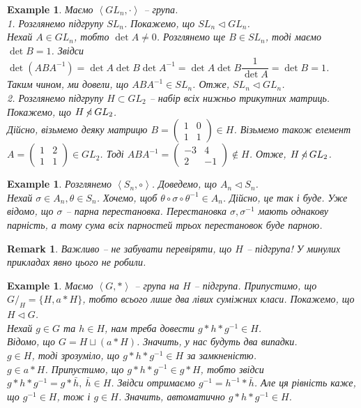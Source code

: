 \documentclass[a4paper, 10pt]{article}
\theoremstyle{theoremdd}
\theoremstyle{theoremdd}
\theoremstyle{theoremdd}
\theoremstyle{theoremdd}
\theoremstyle{theoremdd}
\newtheorem{example}[theorem]{Example}
\theoremstyle{theoremdd}
\theoremstyle{theoremdd}
\theoremstyle{theoremdd}
\theoremstyle{theoremdd}
\theoremstyle{theoremdd}
\theoremstyle{theoremdd}
\newtheorem{remark}[theorem]{Remark}
\theoremstyle{theoremdd}
\theoremstyle{theoremdd}
\theoremstyle{theoremdd}
\theoremstyle{theoremdd}
\begin{document}
\begin{example}
Маємо $\left<GL_n, \cdot \right>$ -- група.\\
1. Розглянемо підгрупу $SL_n$. Покажемо, що $SL_n \triangleleft GL_n$.\\
Нехай $A \in GL_n$, тобто $\det A \neq 0$. Розглянемо ще $B \in SL_n$, тоді маємо $\det B = 1$. Звідси\\
$\det (ABA^{-1}) = \det A \det B \det A^{-1} = \det A \det B \dfrac{1}{\det A} = \det B = 1$.\\
Таким чином, ми довели, що $ABA^{-1} \in SL_n$. Отже, $SL_n \triangleleft GL_n$.
\bigskip \\
2. Розглянемо підгрупу $H \subset GL_2$ -- набір всіх нижньо трикутних матриць. Покажемо, що $H \centernot\triangleleft GL_2$.\\
Дійсно, візьмемо деяку матрицю $B = \begin{pmatrix}
1 & 0 \\
1 & 1
\end{pmatrix} \in H$. Візьмемо також елемент $A = \begin{pmatrix}
1 & 2\\
1 & 1
\end{pmatrix} \in GL_2$. Тоді $ABA^{-1} = \begin{pmatrix}
-3 & 4 \\
2 & -1
\end{pmatrix} \not \in H$. Отже, $H \centernot\triangleleft GL_2$.
\end{example}

\begin{example}
Розглянемо $\left<S_n, \circ\right>$. Доведемо, що $A_n \triangleleft S_n$.\\
Нехай $\sigma \in A_n, \theta \in S_n$. Хочемо, щоб $\theta \circ \sigma \circ \theta^{-1} \in A_n$. Дійсно, це так і буде. Уже відомо, що $\sigma$ -- парна перестановка. Перестановка $\sigma, \sigma^{-1}$ мають однакову парність, а тому сума всіх парностей трьох перестановок буде парною.
\end{example}

\begin{remark}
Важливо -- не забувати перевіряти, що $H$ -- підгрупа! У минулих прикладах явно цього не робили.
\end{remark}

\begin{example}
Маємо $\left< G, * \right>$ -- група на $H$ -- підгрупа. Припустимо, що $G/_H = \{H, a*H\}$, тобто всього лише два лівих суміжних класи. Покажемо, що $H \triangleleft G$.
\bigskip \\
Нехай $g \in G$ та $h \in H$, нам треба довести $g*h*g^{-1} \in H$.\\
Відомо, що $G = H \sqcup (a*H)$. Значить, у нас будуть два випадки.\\
$g \in H$, тоді зрозуміло, що $g*h*g^{-1} \in H$ за замкненістю.\\
$g \in a*H$. Припустимо, що $g*h*g^{-1} \in g*H$, тобто звідси $g*h*g^{-1} = g*\bar{h},\ \bar{h} \in H$. Звідси отримаємо $g^{-1} = h^{-1}*\bar{h}$. Але ця рівність каже, що $g^{-1} \in H$, тож і $g \in H$. Значить, автоматично $g*h*g^{-1} \in H$.
\end{example}
\end{document}
